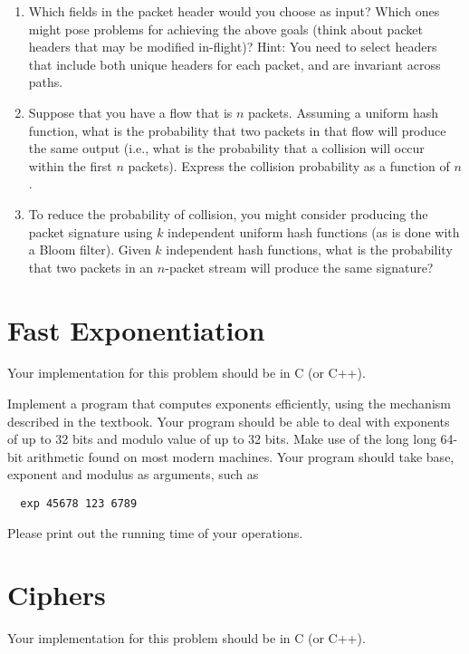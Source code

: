 \documentclass[11pt]{article}
\begin{document}
\begin{enumerate}
\item Which fields in the packet header would you choose as input?
  Which ones might pose problems for achieving the above goals (think
  about packet headers that may be modified in-flight)?  Hint: You need
  to select headers that include both unique headers for each packet,
  and are invariant across paths.
\item Suppose that you have a flow that is $n$ packets.  Assuming a
  uniform hash function, what is the probability that two packets in
  that flow will produce the same output (i.e., what is the probability
  that a collision will occur within the first $n$ packets).  Express
  the collision probability as a function of $n$.
\item To reduce the probability of collision, you might consider
  producing the packet signature using $k$ independent uniform hash
  functions (as is done with a Bloom filter).  Given $k$ independent
  hash functions, what is the probability that two packets in an
  $n$-packet stream will produce the same signature?
\end{enumerate}

\section{Fast Exponentiation}

Your implementation for this problem should be in C (or C++).  

Implement a program that computes exponents efficiently, using the
mechanism described in the textbook. Your program should be able to deal
with exponents of up to 32 bits and modulo value of up to 32 bits. Make
use of the long long 64-bit arithmetic found on most modern
machines. Your program should take base, exponent and modulus as
arguments, such as

\begin{verbatim}
  exp 45678 123 6789
\end{verbatim}

Please print out the running time of your operations.    

\section{Ciphers}

Your implementation for this problem should be in C (or C++).
\end{document}
